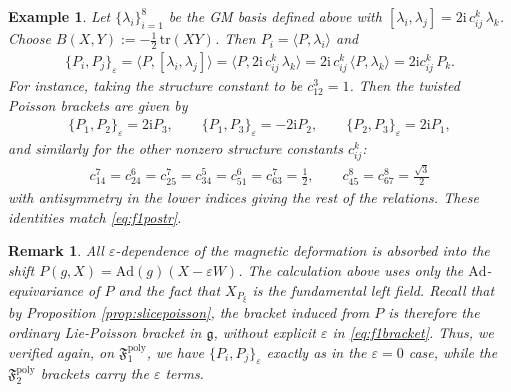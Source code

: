 \documentclass[11pt]{amsart}
\theoremstyle{definition}
\theoremstyle{plain}
\newtheorem{remark}[theorem]{Remark}
\newtheorem{example}[theorem]{Example}
\theoremstyle{conclusion}
\begin{document}
\begin{example} \label{ex:GellMann}
Let $\{\lambda_i\}_{i=1}^8$ be the GM basis defined above with $[\lambda_i,\lambda_j]=2\mathrm{i}\,c_{ij}^k\,\lambda_k$.  Choose $B(X,Y):=-\frac{1}{2}\,\mathrm{tr}(XY)$.  Then $P_i =\langle P,\lambda_i \rangle$ and \begin{align}
\{P_i,P_j\}_\varepsilon= \langle P,[\lambda_i,\lambda_j] \rangle= \langle P,2\mathrm{i}\,c_{ij}^k\,\lambda_k \rangle = 2\mathrm{i}\,c_{ij}^k\, \langle P,\lambda_k\rangle= 2\mathrm{i}c_{ij}^k\,P_k. \label{eq:linearbracket}
\end{align}  %
For instance, taking the structure constant to be $c_{12}^3=1$. Then the twisted Poisson brackets are given by \begin{align*}
\{P_1,P_2\}_\varepsilon= 2\mathrm{i} P_3,\qquad \{P_1,P_3\}_\varepsilon=- 2\mathrm{i} P_2,\qquad \{P_2,P_3\}_\varepsilon= 2\mathrm{i} P_1,
\end{align*} and similarly for the other nonzero structure constants $c_{ij}^k$:
\begin{align*}
c_{14}^7=c_{24}^6=c_{25}^7=c_{34}^5=c_{51}^6=c_{63}^7=\frac{1}{2},\qquad c_{45}^8=c_{67}^8=\frac{\sqrt{3}}{2} 
\end{align*} with antisymmetry in the lower indices giving the rest of the relations. These identities match \eqref{eq:f1postr}.
\end{example}
 
\begin{remark} 
All $\varepsilon$-dependence of the magnetic deformation is absorbed into the shift $P(g,X)=\mathrm{Ad}(g)(X-\varepsilon W)$.  The calculation above uses only the $\mathrm{Ad}$-equivariance of $P$ and the fact that $X_{P_\xi}$ is the fundamental left field. Recall that by Proposition \ref{prop:slicepoisson}, the bracket induced from $P$ is therefore the ordinary Lie-Poisson bracket in $\mathfrak{g}$, without explicit $\varepsilon$ in \eqref{eq:f1bracket}. Thus, we verified again, on $\mathfrak{F}_1^{\mathrm{poly}}$, we have $\{P_i,P_j\}_\varepsilon$ exactly as in the $\varepsilon = 0$ case, while the $\mathfrak{F}_2^{\mathrm{poly}}$ brackets carry the $\varepsilon$ terms.
\end{remark}
\end{document}
